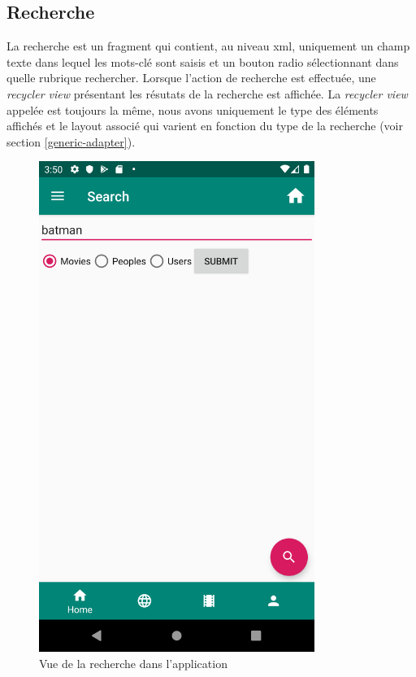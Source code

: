 \subsection{Recherche}
La recherche est un fragment qui contient, au niveau \acrshort{xml}, uniquement un champ texte dans lequel les mots-clé sont saisis et un bouton radio sélectionnant dans quelle rubrique rechercher.
Lorsque l'action de recherche est effectuée, une \textit{recycler view} présentant les résutats de la recherche est affichée.
La \textit{recycler view} appelée est toujours la même, nous avons uniquement le type des éléments affichés et le layout associé qui varient en fonction du type de la recherche (voir section \ref{generic-adapter}).
\begin{figure}
    \begin{center}
        \includegraphics[width=0.8\textwidth]{img/screenshots/search.png}
    \end{center}
    \caption{Vue de la recherche dans l'application}
    \label{search}
\end{figure}


